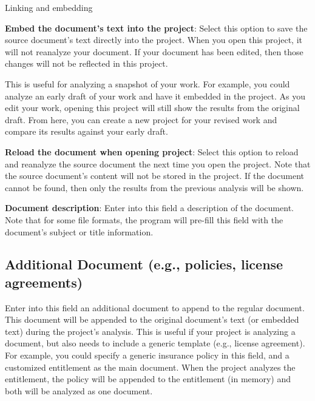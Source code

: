 \documentclass[
]{book}
\newenvironment{optionssection}
    {
    \begin{tcolorbox}[colframe=lightgray,colback=ultralightgray,sharp corners=all,parbox=false]
    }
    {
    \end{tcolorbox}
    }
\newenvironment{optionssectiontitle}
    {
    \begin{tcolorbox}[colframe=lightgray,colback=lightgray]
    \bfseries
    }
    {
    \end{tcolorbox}
    }
\theoremstyle{definition}
\theoremstyle{definition}
\theoremstyle{definition}
\theoremstyle{definition}
\theoremstyle{remark}
\begin{document}
\begin{optionssection}

\begin{optionssectiontitle}
Linking and embedding

\end{optionssectiontitle}

\textbf{Embed the document's text into the project}: Select this option to save the source document's text directly into the project. When you open this project, it will not reanalyze your document. If your document has been edited, then those changes will not be reflected in this project.

This is useful for analyzing a snapshot of your work. For example, you could analyze an early draft of your work and have it embedded in the project. As you edit your work, opening this project will still show the results from the original draft. From here, you can create a new project for your revised work and compare its results against your early draft.

\textbf{Reload the document when opening project}: Select this option to reload and reanalyze the source document the next time you open the project. Note that the source document's content will not be stored in the project. If the document cannot be found, then only the results from the previous analysis will be shown.

\end{optionssection}

\textbf{Document description}: Enter into this field a description of the document. Note that for some file formats, the program will pre-fill this field with the document's subject or title information.

\hypertarget{additional-document}{%
\subsection*{Additional Document (e.g., policies, license agreements)}\label{additional-document}}

Enter into this field an additional document to append to the regular document. This document will be appended to the original document's text (or embedded text) during the project's analysis. This is useful if your project is analyzing a document, but also needs to include a generic template (e.g., license agreement). For example, you could specify a generic insurance policy in this field, and a customized entitlement as the main document. When the project analyzes the entitlement, the policy will be appended to the entitlement (in memory) and both will be analyzed as one document.
\end{document}
